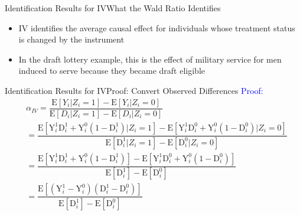 \documentclass[dvipsnames,hyperref={pdfpagelabels=false}]{beamer}
\begin{document}
\begin{frame}{Identification Results for IV}{What the Wald Ratio Identifies}
	\begin{itemize}
		
		\begin{block}{IV Identify LATE}
			\begin{equation*}
			\alpha_{IV}=\dfrac{\mathrm{E}[Y_{i}|Z_{i}=1]-\mathrm{E}[Y_{i}|Z_{i}=0]}{\mathrm{E}[D_{i}|Z_{i}=1]-\mathrm{E}[D_{i}|Z_{i}=0]} 
			= \mathrm{E}[ \mathrm{Y}^{1}_{i} - \mathrm{Y}^{0}_{i} | \mathrm{D}^{1}_{i} > \mathrm{D}^{0}_{i}]
			\end{equation*} 
		\end{block}
		
		\item IV identifies the average causal effect for individuals whose treatment status is changed by the instrument
		\vspace{0.2cm}
		\item In the draft lottery example, this is the effect of military service for men induced to serve because they became draft eligible
	\end{itemize}
\end{frame}



\begin{frame}{Identification Results for IV}{Proof: Convert Observed Differences}
	\textcolor{blue}{Proof:}
	\begin{equation*}
		\begin{aligned}
			&\alpha_{IV}=\dfrac{\mathrm{E}[Y_{i}|Z_{i}=1]-\mathrm{E}[Y_{i}|Z_{i}=0]}{\mathrm{E}[D_{i}|Z_{i}=1]-\mathrm{E}[D_{i}|Z_{i}=0]}  \\
			&= \dfrac{\mathrm{E}[\mathrm{Y}^{1}_{i} \mathrm{D}^{1}_{i}+\mathrm{Y}^{0}_{i}(1-\mathrm{D}^{1}_{i})|Z_{i}=1]-\mathrm{E}[\mathrm{Y}^{1}_{i} \mathrm{D}^{0}_{i}+\mathrm{Y}^{0}_{i} (1-\mathrm{D}^{0}_{i})|Z_{i}=0]}{\mathrm{E}[\mathrm{D}^{1}_{i}|Z_{i}=1]-\mathrm{E}[\mathrm{D}^{0}_{i}|Z_{i}=0]}  \\
			&= \dfrac{\mathrm{E}[\mathrm{Y}^{1}_{i} \mathrm{D}^{1}_{i}+\mathrm{Y}^{0}_{i}(1-\mathrm{D}^{1}_{i})]-\mathrm{E}[\mathrm{Y}^{1}_{i} \mathrm{D}^{0}_{i}+\mathrm{Y}^{0}_{i}(1-\mathrm{D}^{0}_{i})]}{\mathrm{E}[\mathrm{D}^{1}_{i}]-\mathrm{E}[\mathrm{D}^{0}_{i}]}\\
			&= \dfrac{\mathrm{E}[(\mathrm{Y}^{1}_{i}-\mathrm{Y}^{0}_{i})(\mathrm{D}^{1}_{i}-\mathrm{D}^{0}_{i})]}{\mathrm{E}[\mathrm{D}^{1}_{i}]-\mathrm{E}[\mathrm{D}^{0}_{i}]}
		\end{aligned}
	\end{equation*}
\end{frame}
\end{document}
